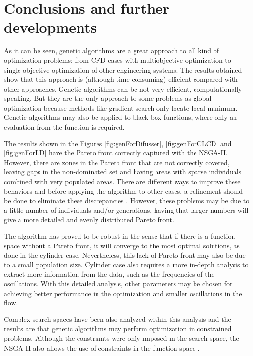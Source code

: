 \chapter{Conclusions and further developments}

As it can be seen, genetic algorithms are a great approach to all kind of optimization problems: from CFD cases with multiobjective optimization to single objective optimization of other engineering systems. The results obtained show that this approach is (although time-consuming) efficient compared with other approaches. Genetic algorithms can be not very efficient, computationally speaking. But they are the only approach to some problems as global optimization because methods like gradient search only locate local minimum. Genetic algorithms may also be applied to black-box functions, where only an evaluation from the function is required. 

The results shown in the Figures \ref{fig:genForDifusser}, \ref{fig:genForCLCD} and \ref{fig:genForLD} have the Pareto front correctly captured with the NSGA-II. However, there are zones in the Pareto front that are not correctly covered, leaving gaps in the non-dominated set and having areas with sparse individuals combined with very populated areas. There are different ways to improve these behaviors and before applying the algorithm to other cases, a refinement should be done to eliminate these discrepancies \cite{chichakly2013improving} \cite{yuan2014improved}. However, these problems may be due to a little number of individuals and/or generations, having that larger numbers will give a more detailed and evenly distributed Pareto front.

The algorithm has proved to be robust in the sense that if there is a function space without a Pareto front, it will converge to the most optimal solutions, as done in the cylinder case. Nevertheless, this lack of Pareto front may also be due to a small population size. Cylinder case also requires a more in-depth analysis to extract more information from the data, such as the frequencies of the oscillations. With this detailed analysis, other parameters may be chosen for achieving better performance in the optimization and smaller oscillations in the flow.

Complex search spaces have been also analyzed within this analysis and the results are that genetic algorithms may perform optimization in constrained problems. Although the constraints were only imposed in the search space, the NSGA-II also allows the use of constraints in the function space \cite{deb2002fast}.

